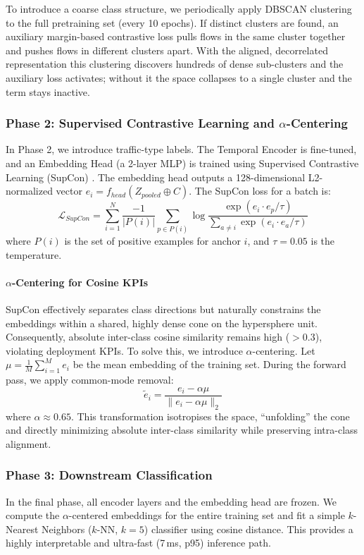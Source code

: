 \documentclass{article}
\begin{document}
To introduce a coarse class structure, we periodically apply DBSCAN clustering to the full pretraining set (every 10 epochs). If distinct clusters are found, an auxiliary margin-based contrastive loss pulls flows in the same cluster together and pushes flows in different clusters apart. With the aligned, decorrelated representation this clustering discovers hundreds of dense sub-clusters and the auxiliary loss activates; without it the space collapses to a single cluster and the term stays inactive.

\subsubsection{Phase 2: Supervised Contrastive Learning and $\alpha$-Centering}
In Phase 2, we introduce traffic-type labels. The Temporal Encoder is fine-tuned, and an Embedding Head (a 2-layer MLP) is trained using Supervised Contrastive Learning (SupCon) \cite{khosla2020supcon}. The embedding head outputs a 128-dimensional L2-normalized vector $e_i = f_{head}(Z_{pooled} \oplus C)$.
The SupCon loss for a batch is:
\begin{equation}
    \mathcal{L}_{SupCon} = \sum_{i=1}^{N} \frac{-1}{|P(i)|} \sum_{p \in P(i)} \log \frac{\exp(e_i \cdot e_p / \tau)}{\sum_{a \neq i} \exp(e_i \cdot e_a / \tau)}
\end{equation}
where $P(i)$ is the set of positive examples for anchor $i$, and $\tau = 0.05$ is the temperature.

\paragraph{$\alpha$-Centering for Cosine KPIs}
SupCon effectively separates class directions but naturally constrains the embeddings within a shared, highly dense cone on the hypersphere unit. Consequently, absolute inter-class cosine similarity remains high ($> 0.3$), violating deployment KPIs. To solve this, we introduce $\alpha$-centering. Let $\mu = \frac{1}{M} \sum_{i=1}^M e_i$ be the mean embedding of the training set. During the forward pass, we apply common-mode removal:
\begin{equation}
    \tilde{e}_i = \frac{e_i - \alpha \mu}{\| e_i - \alpha \mu \|_2}
\end{equation}
where $\alpha \approx 0.65$. This transformation isotropises the space, ``unfolding'' the cone and directly minimizing absolute inter-class similarity while preserving intra-class alignment.

\subsubsection{Phase 3: Downstream Classification}
In the final phase, all encoder layers and the embedding head are frozen. We compute the $\alpha$-centered embeddings for the entire training set and fit a simple $k$-Nearest Neighbors ($k$-NN, $k=5$) classifier using cosine distance. This provides a highly interpretable and ultra-fast (7\,ms, p95) inference path.
\end{document}
